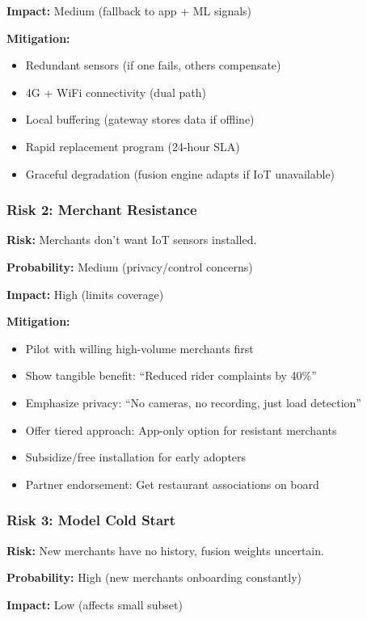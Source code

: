 \documentclass[11pt,a4paper]{article}
\begin{document}
\textbf{Impact:} Medium (fallback to app + ML signals)

\textbf{Mitigation:}
\begin{itemize}[leftmargin=*]
    \item Redundant sensors (if one fails, others compensate)
    \item 4G + WiFi connectivity (dual path)
    \item Local buffering (gateway stores data if offline)
    \item Rapid replacement program (24-hour SLA)
    \item Graceful degradation (fusion engine adapts if IoT unavailable)
\end{itemize}

\subsubsection{Risk 2: Merchant Resistance}

\textbf{Risk:} Merchants don't want IoT sensors installed.

\textbf{Probability:} Medium (privacy/control concerns)

\textbf{Impact:} High (limits coverage)

\textbf{Mitigation:}
\begin{itemize}[leftmargin=*]
    \item Pilot with willing high-volume merchants first
    \item Show tangible benefit: ``Reduced rider complaints by 40\%''
    \item Emphasize privacy: ``No cameras, no recording, just load detection''
    \item Offer tiered approach: App-only option for resistant merchants
    \item Subsidize/free installation for early adopters
    \item Partner endorsement: Get restaurant associations on board
\end{itemize}

\subsubsection{Risk 3: Model Cold Start}

\textbf{Risk:} New merchants have no history, fusion weights uncertain.

\textbf{Probability:} High (new merchants onboarding constantly)

\textbf{Impact:} Low (affects small subset)
\end{document}

